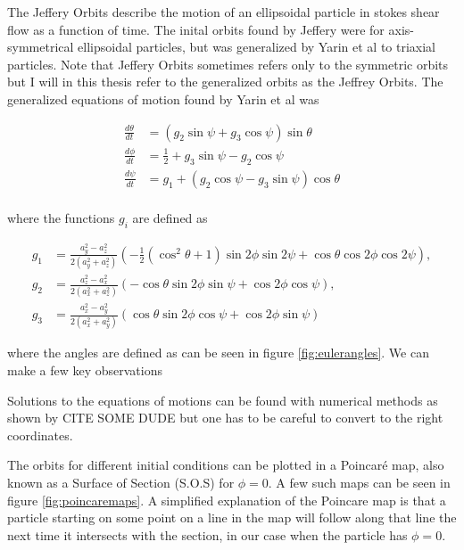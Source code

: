 The Jeffery Orbits describe the motion of an ellipsoidal particle in stokes shear flow as a function of time. The inital orbits found by Jeffery were for axis-symmetrical ellipsoidal particles, but was generalized by Yarin et al \cite{Yarin} to triaxial particles. Note that Jeffery Orbits sometimes refers only to the symmetric orbits but I will in this thesis refer to the generalized orbits as the Jeffrey Orbits. The generalized equations of motion found by Yarin et al was

\begin{subequations}\label{eq:jeffrey}
\begin{align}
\frac{d\theta}{dt} 	&= (g_2 \sin \psi + g_3 \cos \psi ) \sin \theta \\
\frac{d\phi}{dt} 	&= \tfrac{1}{2} + g_3\sin \psi - g_2 \cos \psi\\
\frac{d\psi}{dt}	&= g_1 + (g_2\cos \psi - g_3\sin \psi) \cos \theta \\
\end{align}
\end{subequations}

where the functions  $g_i$ are defined as

\begin{subequations}
\begin{align}
g_1 &= \frac{a_y^2 - a_z^2}{2(a_y^2 + a_z^2)} 
		\left(-\tfrac{1}{2}(\cos^2 \theta + 1 )\sin 2\phi \sin 2\psi + \cos\theta \cos 2\phi \cos 2\psi \right), \\
g_2 &= \frac{a_z^2 - a_x^2}{2(a_x^2 + a_z^2)}
		\left( -\cos\theta \sin 2\phi \sin\psi  +  \cos 2\phi \cos\psi \right), \\
g_3 &= \frac{a_x^2 - a_y^2}{2(a_x^2 + a_y^2)}
		\left( \cos\theta \sin 2\phi \cos\psi + \cos 2\phi \sin\psi \right)
\end{align}
\end{subequations}

where the angles are defined as can be seen in figure \ref{fig:eulerangles}. We can make a few key observations 

Solutions to the equations of motions can be found with numerical methods as shown by CITE SOME DUDE but one has to be careful to convert to the right coordinates. 

The orbits for different initial conditions can be plotted in a Poincaré map, also known as a Surface of Section (S.O.S) \cite{poincare} for $\phi = 0$. A few such maps can be seen in figure \ref{fig:poincaremaps}. A simplified explanation of the Poincare map is that a particle starting on some point on a line in the map will follow along that line the next time it intersects with the section, in our case when the particle has $\phi=0$. 

